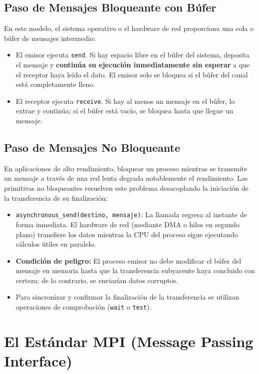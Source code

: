 \subsection{Paso de Mensajes Bloqueante con Búfer}
En este modelo, el sistema operativo o el hardware de red proporciona una cola o búfer de mensajes intermedio:
\begin{itemize}[leftmargin=*]
    \item El emisor ejecuta \texttt{send}. Si hay espacio libre en el búfer del sistema, deposita el mensaje y \textbf{continúa su ejecución inmediatamente sin esperar} a que el receptor haya leído el dato. El emisor solo se bloquea si el búfer del canal está completamente lleno.
    \item El receptor ejecuta \texttt{receive}. Si hay al menos un mensaje en el búfer, lo extrae y continúa; si el búfer está vacío, se bloquea hasta que llegue un mensaje.
\end{itemize}

\subsection{Paso de Mensajes No Bloqueante}
En aplicaciones de alto rendimiento, bloquear un proceso mientras se transmite un mensaje a través de una red lenta degrada notablemente el rendimiento. Las primitivas no bloqueantes resuelven este problema desacoplando la iniciación de la transferencia de su finalización:

\begin{itemize}[leftmargin=*]
    \item \texttt{asynchronous\_send(destino, mensaje)}: La llamada regresa al instante de forma inmediata. El hardware de red (mediante DMA o hilos en segundo plano) transfiere los datos mientras la CPU del proceso sigue ejecutando cálculos útiles en paralelo.
    \item \textbf{Condición de peligro:} El proceso emisor no debe modificar el búfer del mensaje en memoria hasta que la transferencia subyacente haya concluido con certeza; de lo contrario, se enviarían datos corruptos.
    \item Para sincronizar y confirmar la finalización de la transferencia se utilizan operaciones de comprobación (\texttt{wait} o \texttt{test}).
\end{itemize}

\section{El Estándar MPI (Message Passing Interface)}

